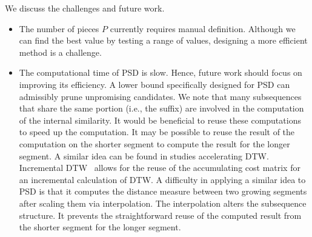 We discuss the challenges and future work.
\begin{itemize}
    \item The number of pieces $P$ currently requires manual definition. 
    Although we can find the best value by testing a range of values, designing a more efficient method is a challenge.
    \item The computational time of PSD is slow. Hence, future work should focus on improving its efficiency.
    A lower bound specifically designed for PSD can admissibly prune unpromising candidates.
    We note that many subsequences that share the same portion (i.e., the suffix) are involved in the computation of the internal similarity. 
    It would be beneficial to reuse these computations to speed up the computation. 
    It may be possible to reuse the result of the computation on the shorter segment to compute the result for the longer segment.
    A similar idea can be found in studies accelerating DTW.
    Incremental DTW~\cite{leodolter2021incdtw} allows for the reuse of the accumulating cost matrix for an incremental calculation of DTW.
    A difficulty in applying a similar idea to PSD is that it computes the distance measure between two growing segments after scaling them via interpolation. 
    The interpolation alters the subsequence structure.
    It prevents the straightforward reuse of the computed result from the shorter segment for the longer segment.
\end{itemize}
